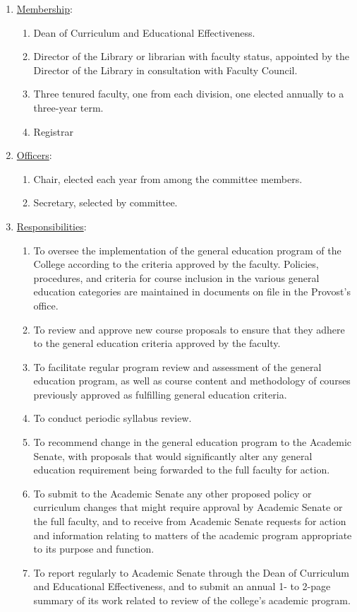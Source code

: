 					\begin{enumerate}[label=\alph*)]
						\item{\underline{Membership}:
							\begin{enumerate}[label=\arabic*)]
								\item{Dean of Curriculum and Educational Effectiveness.}
								\item{Director of the Library or librarian with faculty status, appointed by the Director of the Library in consultation with Faculty Council.}
								\item{Three tenured faculty, one from each division, one elected annually to a three-year term.}
								\item{Registrar}
							\end{enumerate}
						}
						\item{\underline{Officers}:
							\begin{enumerate}[label=\arabic*)]
								\item{Chair, elected each year from among the committee members.}
								\item{Secretary, selected by committee.}
							\end{enumerate}
						}
						\item{\underline{Responsibilities}:
							\begin{enumerate}[label=\arabic*)]
								\item{To oversee the implementation of the general education program of the College according to the criteria approved by the faculty.  Policies, procedures, and criteria for course inclusion in the various general education categories are maintained in documents on file in the Provost's office.}
								\item{To review and approve new course proposals to ensure that they adhere to the general education criteria approved by the faculty.}
								\item{To facilitate regular program review and assessment of the general education program, as well as course content and methodology of courses previously approved as fulfilling general education criteria.}
								\item{To conduct periodic syllabus review.}
								\item{To recommend change in the general education program to the Academic Senate, with proposals that would significantly alter any general education requirement being forwarded to the full faculty for action.}
								\item{To submit to the Academic Senate any other proposed policy or curriculum changes that might require approval by Academic Senate or the full faculty, and to receive from Academic Senate requests for action and information relating to matters of the academic program appropriate to its purpose and function.}
								\item{To report regularly to Academic Senate through the Dean of Curriculum and Educational Effectiveness, and to submit an annual 1- to 2-page summary of its work related to review of the college's academic program.}
							\end{enumerate}
						}
					\end{enumerate}
